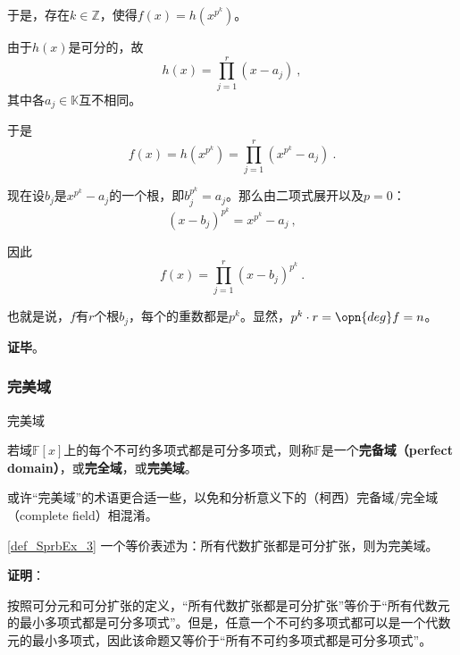 于是，存在$k\in\mathbb{Z}$，使得$f(x) = h(x^{p^k})$。

由于$h(x)$是可分的，故
\begin{equation}
h(x) = \prod_{j=1}^{r}(x-a_j)~,
\end{equation}
其中各$a_j\in\mathbb{K}$互不相同。

于是
\begin{equation}
f(x) = h(x^{p^k}) = \prod_{j=1}^{r}(x^{p^k}-a_j)~.
\end{equation}

现在设$b_j$是$x^{p^k}-a_j$的一个根，即$b_j^{p^k}=a_j$。那么由二项式展开以及$p=0$：
\begin{equation}
(x-b_j)^{p^k} = x^{p^k}-a_j~,
\end{equation}

因此
\begin{equation}
f(x) = \prod_{j=1}^{r} (x-b_j)^{p^k}~.
\end{equation}

也就是说，$f$有$r$个根$b_j$，每个的重数都是$p^k$。显然，$p^k\cdot r = \opn{deg}f = n$。

\textbf{证毕}。










\subsubsection{完美域}


\begin{definition}{完美域}\label{def_SprbEx_3}

若域$\mathbb{F}[x]$上的每个不可约多项式都是可分多项式，则称$\mathbb{F}$是一个\textbf{完备域（perfect domain）}，或\textbf{完全域}，或\textbf{完美域}。


\end{definition}


或许“完美域”的术语更合适一些，以免和分析意义下的（柯西）完备域/完全域（complete field）相混淆。

\begin{theorem}{}\label{the_SprbEx_5}
\autoref{def_SprbEx_3} 一个等价表述为：所有代数扩张都是可分扩张，则为完美域。
\end{theorem}




\textbf{证明}：

按照可分元和可分扩张的定义，“所有代数扩张都是可分扩张”等价于“所有代数元的最小多项式都是可分多项式”。但是，任意一个不可约多项式都可以是一个代数元的最小多项式，因此该命题又等价于“所有不可约多项式都是可分多项式”。

